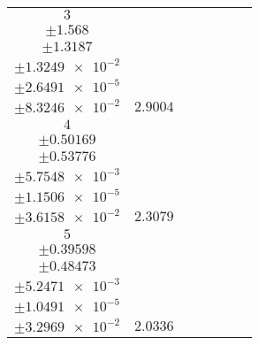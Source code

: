 \documentclass[8pt]{article}
\begin{document}
\begin{longtable}[l]{c c c c c c c}
$\num{3}$ & \begin{tabular}[c]{@{}c@{}}$\num{68.13}$ \\ $\pm\num{1.568}$\end{tabular} & \begin{tabular}[c]{@{}c@{}}$\num{0.48838}$ \\ $\pm\num{1.3187}$\end{tabular} & \begin{tabular}[c]{@{}c@{}}$\num{1.1574e+3}$ \\ $\pm\num{1.3249e-2}$\end{tabular} & \begin{tabular}[c]{@{}c@{}}$\num{2.3143}$ \\ $\pm\num{2.6491e-5}$\end{tabular} & \begin{tabular}[c]{@{}c@{}}$\num{7.8995}$ \\ $\pm\num{8.3246e-2}$\end{tabular} & $\num{2.9004}$\\
$\num{4}$ & \begin{tabular}[c]{@{}c@{}}$\num{53.452}$ \\ $\pm\num{0.50169}$\end{tabular} & \begin{tabular}[c]{@{}c@{}}$\num{-4.0107e-2}$ \\ $\pm\num{0.53776}$\end{tabular} & \begin{tabular}[c]{@{}c@{}}$\num{1.1598e+3}$ \\ $\pm\num{5.7548e-3}$\end{tabular} & \begin{tabular}[c]{@{}c@{}}$\num{2.319}$ \\ $\pm\num{1.1506e-5}$\end{tabular} & \begin{tabular}[c]{@{}c@{}}$\num{6.9911}$ \\ $\pm\num{3.6158e-2}$\end{tabular} & $\num{2.3079}$\\
$\num{5}$ & \begin{tabular}[c]{@{}c@{}}$\num{46.805}$ \\ $\pm\num{0.39598}$\end{tabular} & \begin{tabular}[c]{@{}c@{}}$\num{1.0755}$ \\ $\pm\num{0.48473}$\end{tabular} & \begin{tabular}[c]{@{}c@{}}$\num{1.166e+3}$ \\ $\pm\num{5.2471e-3}$\end{tabular} & \begin{tabular}[c]{@{}c@{}}$\num{2.3314}$ \\ $\pm\num{1.0491e-5}$\end{tabular} & \begin{tabular}[c]{@{}c@{}}$\num{6.6178}$ \\ $\pm\num{3.2969e-2}$\end{tabular} & $\num{2.0336}$\\

\end{longtable}
\end{document}
